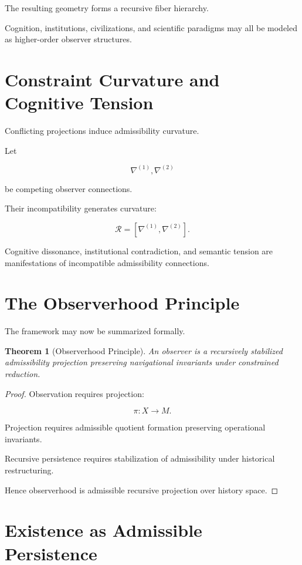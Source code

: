 \documentclass[12pt,openany]{book}
\theoremstyle{plain}
\newtheorem{theorem}{Theorem}[chapter]
\theoremstyle{definition}
\theoremstyle{remark}
\begin{document}
The resulting geometry forms a recursive fiber hierarchy.

Cognition, institutions, civilizations, and scientific paradigms
may all be modeled as higher-order observer structures.

\section{Constraint Curvature and Cognitive Tension}

Conflicting projections induce admissibility curvature.

Let

\[
\nabla^{(1)},
\nabla^{(2)}
\]

be competing observer connections.

Their incompatibility generates curvature:

\[
\mathcal{R}
=
[\nabla^{(1)},\nabla^{(2)}].
\]

Cognitive dissonance, institutional contradiction, and semantic
tension are manifestations of incompatible admissibility
connections.

\section{The Observerhood Principle}

The framework may now be summarized formally.

\begin{theorem}[Observerhood Principle]
An observer is a recursively stabilized admissibility projection
preserving navigational invariants under constrained reduction.
\end{theorem}

\begin{proof}
Observation requires projection:

\[
\pi :
X \to M.
\]

Projection requires admissible quotient formation preserving
operational invariants.

Recursive persistence requires stabilization of admissibility
under historical restructuring.

Hence observerhood is admissible recursive projection over
history space.
\end{proof}

\section{Existence as Admissible Persistence}
\end{document}
